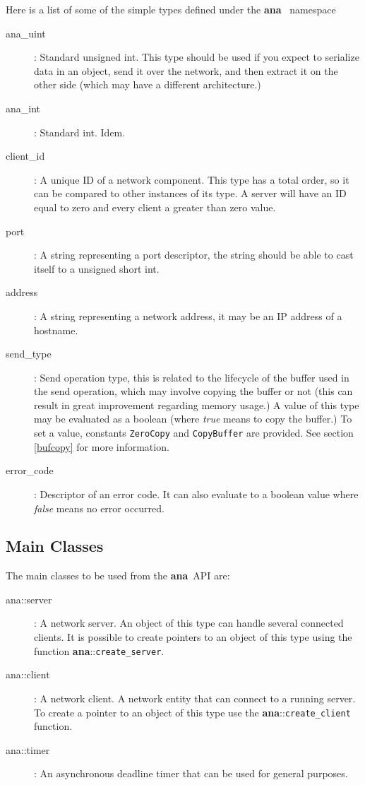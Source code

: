 \documentclass[a4paper,12pt,english]{article}
\newcommand{\ana}{\textbf{ana}}
\begin{document}
Here is  a list  of some of  the simple  types defined under  the \ana
\ namespace

\begin{description}
   \item [ana\_uint] : Standard unsigned int. This type should be used
     if you  expect to serialize data  in an object, send  it over the
     network, and then extract it on  the other side (which may have a
     different architecture.)
   \item [ana\_int] :  Standard int. Idem.
   \item [client\_id] : A unique  ID of a network component. This type
     has a  total order, so it  can be compared to  other instances of
     its type. A server will have an ID equal to zero and every client
     a greater than zero value.
   \item [port] : A string representing a port  descriptor, the string
     should be able to cast itself to a unsigned short int.
   \item [address] : A string  representing a network  address, it may 
     be an IP address of a hostname.
   \item [send\_type]  : Send operation  type, this is related  to the
     lifecycle of  the buffer  used in the  send operation,  which may
     involve  copying the  buffer or  not  (this can  result in  great
     improvement regarding memory usage.)  A value of this type may be
     evaluated  as a  boolean  (where \emph{true}  means  to copy  the
     buffer.)   To  set   a  value,  constants  \texttt{ZeroCopy}  and
     \texttt{CopyBuffer} are provided.   See section \ref{bufcopy} for
     more information.
   \item  [error\_code] :  Descriptor of  an error  code. It  can also
     evaluate  to a boolean  value where  \emph{false} means  no error
     occurred.
\end{description}

\subsection{Main Classes}

The main classes to be used from the \ana \ API are:
\begin{description}

\item[ana::server] :  A network  server.  An object  of this  type can
  handle several connected clients.  It is possible to create pointers
  to    an    object    of    this    type    using    the    function
  \ana::\texttt{create\_server}.

\item[ana::client]  : A  network  client. A  network  entity that  can
  connect to  a running server.  To create a  pointer to an  object of
  this type use the \ana::\texttt{create\_client} function.

\item[ana::timer] :  An asynchronous deadline  timer that can  be used
  for general  purposes.
\end{description}
\end{document}
